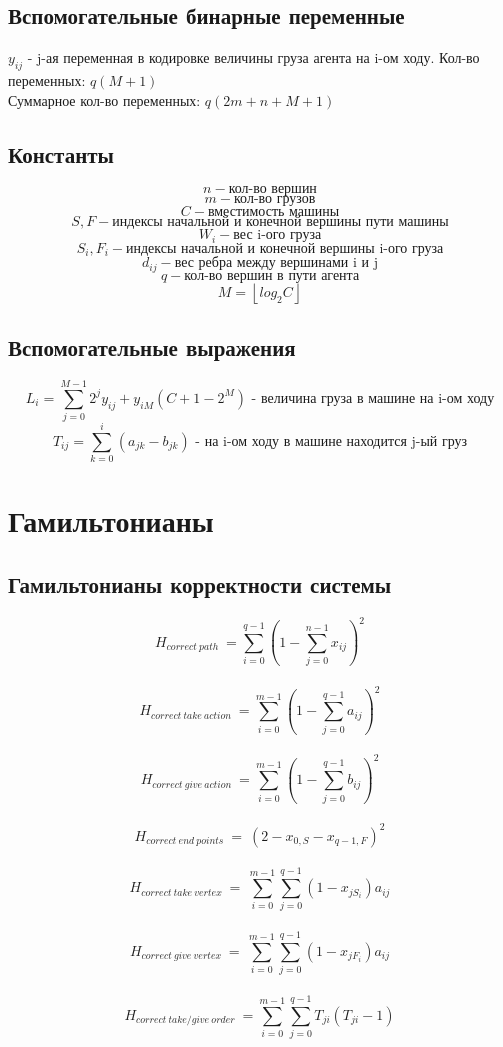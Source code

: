 \documentclass{article}
\begin{document}
\subsection{Вспомогательные бинарные переменные}
\(y_{ij}\) - j-ая переменная в кодировке величины груза агента на i-ом ходу. Кол-во переменных: \(q(M+1)\) \\

Суммарное кол-во переменных: \(q(2m + n + M + 1)\)


\subsection{Константы}
\[n - \text{кол-во вершин}\]
\[m - \text{кол-во грузов}\]
\[C - \text{вместимость машины}\]
\[S, F - \text{индексы начальной и конечной вершины пути машины}\]
\[W_i - \text{вес i-ого груза}\]
\[S_i, F_i - \text{индексы начальной и конечной вершины i-ого груза}\]
\[d_{ij} - \text{вес ребра между вершинами i и j}\]
\[q - \text{кол-во вершин в пути агента}\]
\[M = \left \lfloor{log_{2} C}\right \rfloor \]







\subsection{Вспомогательные выражения}
\[L_{i} = \sum_{j=0}^{M-1} 2^j y_{ij} + y_{i M} (C + 1 - 2^M) \text{ - величина груза в машине на i-ом ходу}\]
\[T_{ij} = \sum_{k=0}^{i} (a_{jk} - b_{jk}) \text{ - на i-ом ходу в машине находится j-ый груз}\]

\section{Гамильтонианы}

\subsection{Гамильтонианы корректности системы}

\[H_{correct \ path} \ = \sum_{i=0}^{q - 1} (1-\sum_{j=0}^{n-1}x_{ij})^2\]\\
\[H_{correct \ take \ action} \ = \sum_{i=0}^{m - 1} (1-\sum_{j=0}^{q-1}a_{ij})^2\]\\
\[H_{correct \ give \ action} \ = \sum_{i=0}^{m - 1} (1-\sum_{j=0}^{q-1}b_{ij})^2\]\\

\[H_{correct \ end \ points} \ = \ (2 - x_{0, S} -x_{q-1, F})^2 \]\\
\[H_{correct \ take \ vertex} \ =\ \sum_{i=0}^{m-1} \sum_{j=0}^{q-1}(1 - x_{jS_{i}})a_{ij} \]\\
\[H_{correct \ give \ vertex} \ =\ \sum_{i=0}^{m-1} \sum_{j=0}^{q-1}(1 - x_{jF_{i}})a_{ij} \]\\
\[H_{correct \ take/give \ order} \ =\sum_{i=0}^{m-1} \sum_{j=0}^{q-1} T_{ji} (T_{ji} - 1) \]\\
\end{document}
